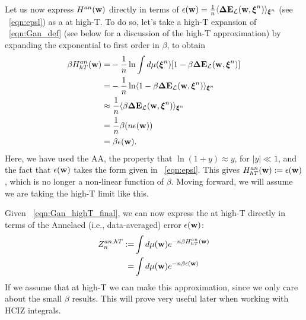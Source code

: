 

Let us now express $H^{an}({\mathbf{w}})$ directly in terms of $\epsilon({\mathbf{w}})=\tfrac{1}{n}\langle\mathbf{\Delta {E}}_{\mathcal{L}}(\mathbf{w}, \boldsymbol{\xi}^{n}) \rangle_{\boldsymbol{\xi}^{n}}$ (see \EQN~\ref{eqn:epsl}) as a \ThermalAverage at high-T.
To do so, let's take a high-T expansion of \EQN~\ref{eqn:Gan_def} (see below for a discussion of the high-T approximation) by expanding the exponential to first order in $\beta$, to obtain
\begin{align}
\label{eqn:Gan_highT}
\beta H^{an}_{hT}({\mathbf{w}})
=&  - \frac{1}{n}\ln \int d\mu(\boldsymbol{\xi}^{n}) [1-\beta \mathbf{\Delta {E}}_{\mathcal{L}}(\mathbf{w}, \boldsymbol{\xi}^{n})] \\ \nonumber
=&  - \frac{1}{n}\ln\langle 1-\beta\mathbf{\Delta {E}}_{\mathcal{L}}(\mathbf{w}, \boldsymbol{\xi}^{n}) \rangle_{\boldsymbol{\xi}^{n}} \\ \nonumber
\approx&\;  \frac{1}{n}\langle \beta\mathbf{\Delta {E}}_{\mathcal{L}}(\mathbf{w}, \boldsymbol{\xi}^{n}) \rangle_{\boldsymbol{\xi}^{n}} \\ \nonumber
=&\;\frac{1}{n}\beta (n\epsilon({\mathbf{w}}))\\ 
\label{eqn:Gan_highT_final}
=&\;\beta \epsilon({\mathbf{w}})  .
\end{align}
Here, we have used the AA, the property that $\ln(1 + y) \approx y$, for $|y| \ll 1$, and the fact that $\epsilon({\mathbf{w}})$ takes the form given in \EQN~\ref{eqn:epsl}.
This gives $H^{an}_{hT}({\mathbf{w}}):=\epsilon({\mathbf{w}})$, which is no longer a non-linear function of $\beta$.
Moving forward, we will assume we are taking the high-T limit like this.

Given \EQN~\ref{eqn:Gan_highT_final}, we can now express the \Annealed \PartitionFunction at high-T directly in terms of
the Annelaed (i.e., data-averaged) error $\epsilon({\mathbf{w}})$:
\begin{align}
  \nonumber
  \label{eqn:Zanht_def}
Z^{an,hT}_{n} :=  &\int d\mu({\mathbf{w}}) e^{-n\beta H^{an}_{hT}({\mathbf{w}})} \\ 
  =  &\int d\mu({\mathbf{w}}) e^{-n\beta\epsilon({\mathbf{w}})} 
\end{align}
If we assume that at high-T we can make this approximation, 
since we only care about the small $\beta$ results. 
This will prove very useful later when working with HCIZ integrals.


